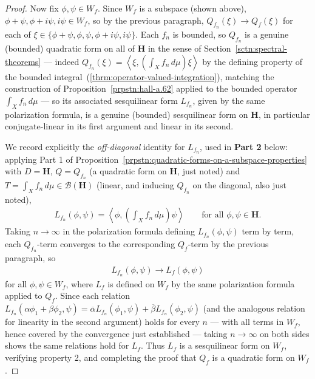 \begin{proof}
Now fix $\phi, \psi \in W_f$. Since $W_f$ is a subspace (shown above), $\phi + \psi, \phi + i\psi, i\psi \in W_f$, so by the previous paragraph, $Q_{f_n}(\xi) \to Q_f(\xi)$ for each of $\xi \in \{ \phi + \psi, \phi, \psi, \phi + i\psi, i\psi \}$. Each $f_n$ is bounded, so $Q_{f_n}$ is a genuine (bounded) quadratic form on all of $\mathbf{H}$ in the sense of Section~\ref{sctn:spectral-theorems} — indeed $Q_{f_n}(\xi) = \left< \xi, \left( \int_X f_n \, d\mu \right) \xi \right>$ by the defining property of the bounded integral~(\ref{thrm:operator-valued-integration}), matching the construction of Proposition~\ref{prpstn:hall-a.62} applied to the bounded operator $\int_X f_n \, d\mu$ — so its associated sesquilinear form $L_{f_n}$, given by the same polarization formula, is a genuine (bounded) sesquilinear form on $\mathbf{H}$, in particular conjugate-linear in its first argument and linear in its second.

We record explicitly the \textit{off-diagonal} identity for $L_{f_n}$, used in \textbf{Part 2} below: applying Part 1 of Proposition~\ref{prpstn:quadratic-forms-on-a-subspace-properties} with $D = \mathbf{H}$, $Q = Q_{f_n}$ (a quadratic form on $\mathbf{H}$, just noted) and $T = \int_X f_n \, d\mu \in \mathcal{B}(\mathbf{H})$ (linear, and inducing $Q_{f_n}$ on the diagonal, also just noted),
\begin{align}
    L_{f_n}(\phi, \psi) = \left< \phi, \left( \int_X f_n \, d\mu \right) \psi \right> \qquad \text{for all } \phi, \psi \in \mathbf{H}. \tag{$\S$}
\end{align}
Taking $n \to \infty$ in the polarization formula defining $L_{f_n}(\phi, \psi)$ term by term, each $Q_{f_n}$-term converges to the corresponding $Q_f$-term by the previous paragraph, so
\begin{align}
    L_{f_n}(\phi, \psi) \longrightarrow L_f(\phi, \psi)
\end{align}
for all $\phi, \psi \in W_f$, where $L_f$ is defined on $W_f$ by the same polarization formula applied to $Q_f$. Since each relation $L_{f_n}(\alpha\phi_1 + \beta\phi_2, \psi) = \overline{\alpha} L_{f_n}(\phi_1, \psi) + \overline{\beta} L_{f_n}(\phi_2, \psi)$ (and the analogous relation for linearity in the second argument) holds for every $n$ — with all terms in $W_f$, hence covered by the convergence just established — taking $n \to \infty$ on both sides shows the same relations hold for $L_f$. Thus $L_f$ is a sesquilinear form on $W_f$, verifying property 2, and completing the proof that $Q_f$ is a quadratic form on $W_f$.


\end{proof}
